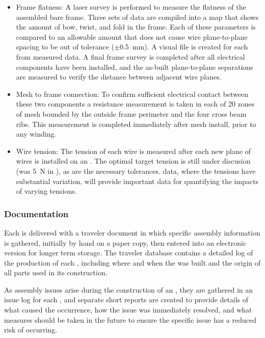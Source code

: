 \begin{itemize}

\item Frame flatness: A laser survey is performed to measure the flatness of the assembled bare frame. Three sets of data are compiled into a map that shows the amount of bow, twist, and fold in the frame. Each of these parameters is compared to an allowable amount that does not cause wire plane-to-plane spacing to be out of tolerance ($\pm$\SI{0.5}{mm}).  A visual file is created for each  from measured data. A final frame survey is completed after all electrical components have been installed, and the as-built plane-to-plane separations are measured to verify the distance between adjacent wire planes.

\item Mesh to frame connection: To confirm sufficient electrical contact between these two components a resistance measurement is taken in each of \num{20} zones of mesh bounded by the outside frame perimeter and the four cross beam ribs. This measurement is completed immediately after mesh install, prior to any winding.

\item Wire tension: The tension of each wire is measured after each new plane of wires is installed on an . The optimal target tension is still under discusion (was \SI{5}{N} in ), as are the necessary tolerances.   data, where the tensions have substantial variation, will provide important data for quantifying the impacts of varying tensions.  

\end{itemize}


\subsubsection{Documentation} 

Each  is delivered with a traveler document in which specific assembly information is gathered, initially by hand on a paper copy, then entered into an electronic version for longer term storage.  The traveler database contains a detailed log of the production of each , including where and when the  was built and the origin of all parts used in its construction. 

As assembly issues arise during the construction of an , they are gathered in an issue log for each , and separate short reports are created to provide details of what caused the occurrence, how the issue was immediately resolved, and what measures should be taken in the future to ensure the specific issue has a reduced risk of occurring.  
